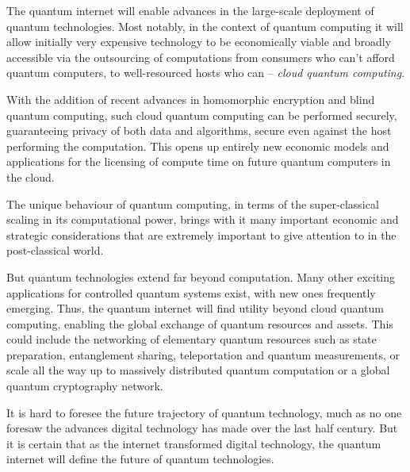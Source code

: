 The quantum internet will enable advances in the large-scale deployment of quantum technologies. Most notably, in the context of quantum computing it will allow initially very expensive technology to be economically viable and broadly accessible via the outsourcing of computations from consumers who can't afford quantum computers, to well-resourced hosts who can -- \textit{cloud quantum computing}.

With the addition of recent advances in homomorphic encryption and blind quantum computing, such cloud quantum computing can be performed securely, guaranteeing privacy of both data and algorithms, secure even against the host performing the computation. This opens up entirely new economic models and applications for the licensing of compute time on future quantum computers in the cloud.

The unique behaviour of quantum computing, in terms of the super-classical scaling in its computational power, brings with it many important economic and strategic considerations that are extremely important to give attention to in the post-classical world.

But quantum technologies extend far beyond computation. Many other exciting applications for controlled quantum systems exist, with new ones frequently emerging. Thus, the quantum internet will find utility beyond cloud quantum computing, enabling the global exchange of quantum resources and assets. This could include the networking of elementary quantum resources such as state preparation, entanglement sharing, teleportation and quantum measurements, or scale all the way up to massively distributed quantum computation or a global quantum cryptography network.

It is hard to foresee the future trajectory of quantum technology, much as no one foresaw the advances digital technology has made over the last half century. But it is certain that as the internet transformed digital technology, the quantum internet will define the future of quantum technologies.